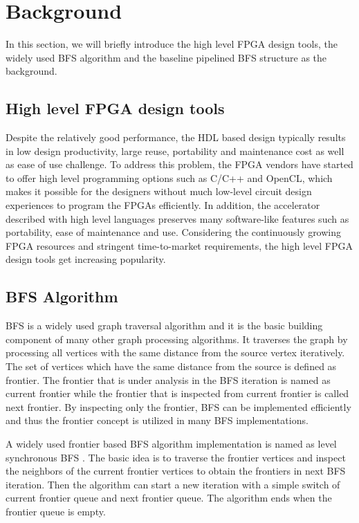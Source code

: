 \section{Background} \label{sec:background}
In this section, we will briefly introduce the high level FPGA design tools,
the widely used BFS algorithm and the baseline pipelined BFS structure 
as the background.

\subsection{High level FPGA design tools}
Despite the relatively good performance, 
the HDL based design typically results in low design productivity, large reuse, 
portability and maintenance cost as well as ease of use challenge. 
To address this problem, the FPGA vendors have started 
to offer high level programming options such as C/C++ and OpenCL, which makes 
it possible for the designers without much low-level circuit design 
experiences \cite{nimbix, xilinx-sdaccel, intel-opencl} 
to program the FPGAs efficiently. In addition, the accelerator 
described with high level languages preserves many software-like features 
such as portability, ease of maintenance and use. Considering the  
continuously growing FPGA resources and stringent time-to-market requirements, 
the high level FPGA design tools \cite{Nane2016hls-survey} get increasing popularity.

\subsection{BFS Algorithm}
BFS is a widely used graph traversal algorithm and it is the basic 
building component of many other graph processing algorithms. 
It traverses the graph by processing all vertices with the same distance from the 
source vertex iteratively. The set of vertices which have the same distance from the 
source is defined as frontier. The frontier that is under analysis in the BFS iteration 
is named as current frontier while the frontier that is inspected from current frontier 
is called next frontier. By inspecting only the frontier, BFS can be implemented efficiently 
and thus the frontier concept is utilized in many BFS implementations.

A widely used frontier based BFS algorithm implementation is named as 
level synchronous BFS \cite{attia2014cygraph, betkaoui2012reconfigurable, 
zhang2017boosting}. The basic idea is to traverse the frontier vertices 
and inspect the neighbors of the current frontier vertices to obtain the 
frontiers in next BFS iteration. Then the algorithm can start a new 
iteration with a simple switch of current frontier queue and next frontier queue. 
The algorithm ends when the frontier queue is empty.

